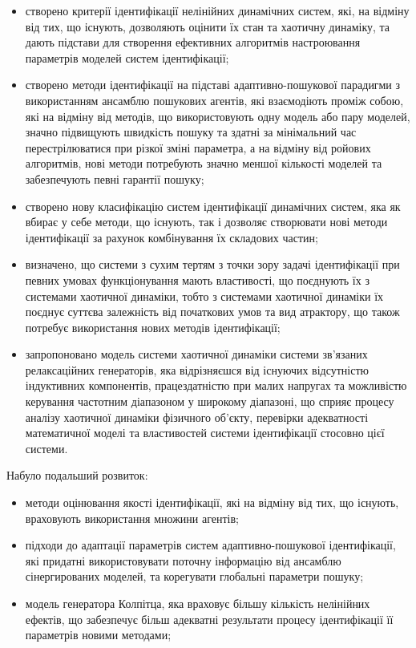 \documentclass[a4paper,13pt]{atuaref}
\begin{document}
\begin{itemize}

  \item
  створено критерії ідентифікації нелінійних динамічних систем,
  які, на відміну від тих, що існують, дозволяють оцінити їх стан та
  хаотичну динаміку, та дають підстави для створення ефективних алгоритмів
  настроювання параметрів моделей систем ідентифікації;

  \item
  створено методи ідентифікації на підставі
  адаптивно-пошукової парадигми з використанням ансамблю пошукових агентів,
  які взаємодіють проміж собою, які на відміну від методів, що використовують
  одну модель або пару моделей, значно підвищують швидкість пошуку та
  здатні за мінімальний час перестрілюватися при різкої зміні параметра, а на
  відміну від ройових алгоритмів, нові методи потребують значно меншої
  кількості моделей та забезпечують певні гарантії пошуку;

  \item
  створено нову класифікацію систем ідентифікації динамічних систем,
  яка як вбирає у себе методи, що існують, так і дозволяє
  створювати нові методи ідентифікації за рахунок
  комбінування їх складових частин;

  \item
   визначено, що системи з сухим тертям з точки зору задачі ідентифікації
   при певних  умовах функціонування
   мають властивості, що поєднують їх з системами хаотичної динаміки, тобто з
   системами хаотичної динаміки їх поєднує суттєва залежність від початкових
   умов та вид атрактору, що також потребує використання нових методів ідентифікації;

  \item
   запропоновано модель системи хаотичної динаміки системи зв'язаних релаксаційних генераторів,
   яка відрізняєшся від існуючих відсутністю індуктивних компонентів,
   працездатністю при малих напругах та можливістю
   керування частотним діапазоном у широкому діапазоні,
   що сприяє процесу аналізу хаотичної динаміки
   фізичного об'єкту, перевірки адекватності математичної моделі
   та властивостей системи ідентифікації стосовно цієї системи.
\end{itemize}

\noindent
Набуло подальший розвиток:
\begin{itemize}

  \item
  методи оцінювання якості ідентифікації,
  які на відміну від тих, що існують,
  враховують використання множини агентів;

  \item
  підходи до адаптації параметрів систем
  адаптивно-пошукової ідентифікації, які придатні використовувати поточну
  інформацію від ансамблю сінергированих моделей, та корегувати глобальні
  параметри пошуку;

  \item
    модель генератора Колпітца, яка враховує
    більшу кількість нелінійних ефектів,
    що забезпечує більш адекватні результати процесу
    ідентифікації її параметрів новими методами;

\end{itemize}
\end{document}
